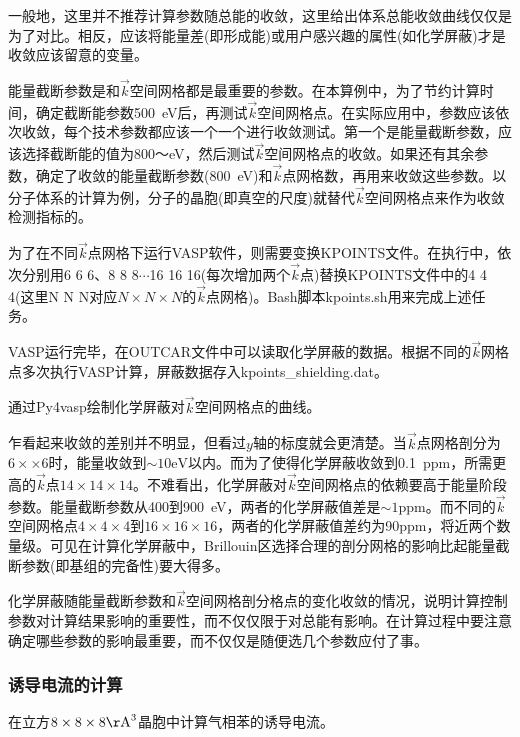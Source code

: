 一般地，这里并不推荐计算参数随总能的收敛，这里给出体系总能收敛曲线仅仅是为了对比。相反，应该将能量差(即形成能)或用户感兴趣的属性(如化学屏蔽)才是收敛应该留意的变量。

能量截断参数是和$\vec k$空间网格都是最重要的参数。在本算例中，为了节约计算时间，确定截断能参数\textrm{500~eV}后，再测试$\vec k$空间网格点。在实际应用中，参数应该依次收敛，每个技术参数都应该一个一个进行收敛测试。第一个是能量截断参数，应该选择截断能的值为\textrm{800～eV}，然后测试$\vec k$空间网格点的收敛。如果还有其余参数，确定了收敛的能量截断参数\textrm{(800~eV)}和$\vec k$点网格数，再用来收敛这些参数。以分子体系的计算为例，分子的晶胞(即真空的尺度)就替代$\vec k$空间网格点来作为收敛检测指标的。

为了在不同$\vec k$点网格下运行\textrm{VASP}软件，则需要变换\textrm{KPOINTS}文件。在执行中，依次分别用\textsc{6 6 6}、\textsc{8 8 8}$\cdots$\textsc{16 16 16}(每次增加两个$\vec k$点)替换\textrm{KPOINTS}文件中的\textsc{4  4  4}(这里\textsc{N N N}对应$N\times N\times N$的$\vec k$点网格)。\textrm{Bash}脚本\textrm{kpoints.sh}用来完成上述任务。

\textrm{VASP}运行完毕，在\textrm{OUTCAR}文件中可以读取化学屏蔽的数据。根据不同的$\vec k$网格点多次执行\textrm{VASP}计算，屏蔽数据存入\textrm{kpoints\_shielding.dat}。%

通过\textrm{Py4vasp}绘制化学屏蔽对$\vec k$空间网格点的曲线。

乍看起来收敛的差别并不明显，但看过$y$轴的标度就会更清楚。当$\vec k$点网格剖分为$6\times\times6$时，能量收敛到$\sim10\mathrm{eV}$以内。而为了使得化学屏蔽收敛到\textrm{0.1~ppm}，所需更高的$\vec k$点$14\times14\times14$。不难看出，化学屏蔽对$\vec k$空间网格点的依赖要高于能量阶段参数。能量截断参数从400到\textrm{900~eV}，两者的化学屏蔽值差是$\sim1\mathrm{ppm}$。而不同的$\vec k$空间网格点$4\times4\times4$到$16\times16\times16$，两者的化学屏蔽值差约为\textrm{90ppm}，将近两个数量级。可见在计算化学屏蔽中，\textrm{Brillouin}区选择合理的剖分网格的影响比起能量截断参数(即基组的完备性)要大得多。

化学屏蔽随能量截断参数和$\vec k$空间网格剖分格点的变化收敛的情况，说明计算控制参数对计算结果影响的重要性，而不仅仅限于对总能有影响。在计算过程中要注意确定哪些参数的影响最重要，而不仅仅是随便选几个参数应付了事。

\subsubsection{诱导电流的计算}
在立方$8\times8\times8\mathrm{\AA}^3$晶胞中计算气相苯的诱导电流。

